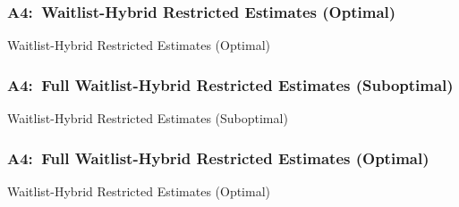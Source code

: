 \documentclass[12pt, aspectratio=169]{beamer}
\begin{document}
\begin{frame}[label=whreo]
\frametitle{A4:\ Waitlist-Hybrid Restricted Estimates (Optimal)}
\addtocounter{framenumber}{-1}
\begin{table}[htbp]
  \centering
  \addtocounter{table}{-1}
  \renewcommand{\thetable}{\arabic{table}b}
  \caption{Waitlist-Hybrid Restricted Estimates (Optimal)}
  \vspace{5pt}
  \begin{adjustbox}{totalheight=.7\textheight}

  \end{adjustbox}
\end{table}%
\hyperlink{wdueo}{}
\end{frame}

\begin{frame}[label=fwhres]
\frametitle{A4:\ Full Waitlist-Hybrid Restricted Estimates (Suboptimal)}
\begin{table}[htbp]
  \centering
  \vspace{-5pt}
  \renewcommand{\thetable}{\arabic{table}a}
  \caption{Waitlist-Hybrid Restricted Estimates (Suboptimal)}
  \vspace{5pt}
  \begin{adjustbox}{totalheight=.7\textheight}

  \end{adjustbox}
\end{table}%
\hyperlink{wdues}{}
\end{frame}

\begin{frame}[label=fwhreo]
\frametitle{A4:\ Full Waitlist-Hybrid Restricted Estimates (Optimal)}
\addtocounter{framenumber}{-1}
\begin{table}[htbp]
  \centering
  \vspace{-5pt}
  \addtocounter{table}{-1}
  \renewcommand{\thetable}{\arabic{table}b}
  \caption{Waitlist-Hybrid Restricted Estimates (Optimal)}
  \vspace{5pt}
  \begin{adjustbox}{totalheight=.7\textheight}

  \end{adjustbox}
\end{table}%
\hyperlink{wdueo}{}
\end{frame}
\end{document}
